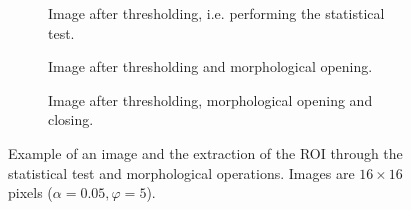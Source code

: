 \begin{figure}[H]
\begin{subfigure}[t]{0.48\linewidth}
		\caption{Image after thresholding, i.e. performing the statistical test.}
		\label{fig: exampleI}
	\end{subfigure}
	\hfill
	\begin{subfigure}[t]{0.48\linewidth}
		\centering
		\caption{Image after thresholding and morphological opening.}
		\label{fig: exampleI_o}
	\end{subfigure}
	\vfill
	\begin{subfigure}[t]{0.48\linewidth}
		\centering
		\caption{Image after thresholding, morphological opening and closing.}
		\label{fig: exampleI_oc}
	\end{subfigure}
	\caption{Example of an image and the extraction of the ROI through the statistical test and morphological operations. Images are $16 \times 16$ pixels ($\alpha = 0.05, \varphi = 5$).}
	\label{fig: example}
\end{figure}